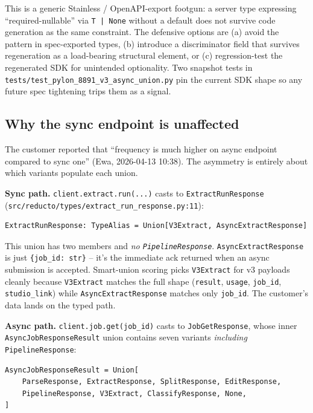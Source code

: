 \documentclass[11pt]{article}
\begin{document}
This is a generic Stainless / OpenAPI-export footgun: a server type expressing ``required-nullable'' via \texttt{T | None} without a default does not survive code generation as the same constraint. The defensive options are (a) avoid the pattern in spec-exported types, (b) introduce a discriminator field that survives regeneration as a load-bearing structural element, or (c) regression-test the regenerated SDK for unintended optionality. Two snapshot tests in \texttt{tests/test\_pylon\_8891\_v3\_async\_union.py} pin the current SDK shape so any future spec tightening trips them as a signal.

\subsection{Why the sync endpoint is unaffected}

The customer reported that ``frequency is much higher on async endpoint compared to sync one'' (Ewa, 2026-04-13 10:38). The asymmetry is entirely about which variants populate each union.

\textbf{Sync path.} \texttt{client.extract.run(...)} casts to \texttt{ExtractRunResponse} (\texttt{src/reducto/types/extract\_run\_response.py:11}):

\begin{lstlisting}[style=py]
ExtractRunResponse: TypeAlias = Union[V3Extract, AsyncExtractResponse]
\end{lstlisting}

This union has two members and \emph{no \texttt{PipelineResponse}}. \texttt{AsyncExtractResponse} is just \texttt{\{job\_id: str\}} -- it's the immediate ack returned when an async submission is accepted. Smart-union scoring picks \texttt{V3Extract} for v3 payloads cleanly because \texttt{V3Extract} matches the full shape (\texttt{result}, \texttt{usage}, \texttt{job\_id}, \texttt{studio\_link}) while \texttt{AsyncExtractResponse} matches only \texttt{job\_id}. The customer's data lands on the typed path.

\textbf{Async path.} \texttt{client.job.get(job\_id)} casts to \texttt{JobGetResponse}, whose inner \texttt{AsyncJobResponseResult} union contains seven variants \emph{including} \texttt{PipelineResponse}:

\begin{lstlisting}[style=py]
AsyncJobResponseResult = Union[
    ParseResponse, ExtractResponse, SplitResponse, EditResponse,
    PipelineResponse, V3Extract, ClassifyResponse, None,
]
\end{lstlisting}
\end{document}
